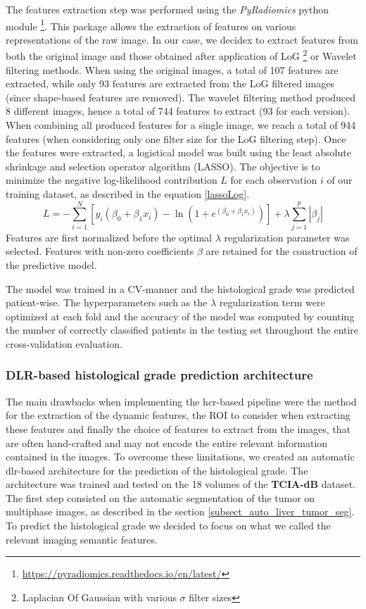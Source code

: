 \documentclass[]{article}
\newcommand{\lmttfont}[1]{{\fontfamily{lmtt}\selectfont #1}}
\begin{document}
The features extraction step was performed using the \textit{PyRadiomics} python module \footnote{\url{https://pyradiomics.readthedocs.io/en/latest/}}. This package allows the extraction of features on various representations of the raw image. In our case, we decidex to extract features from both the original image and those obtained after application of LoG \footnote{Laplacian Of Gaussian with various $\sigma$ filter sizes} or Wavelet filtering methods. When using the original images, a total of 107 features are extracted, while only 93 features are extracted from the LoG filtered images (since shape-based features are removed). The wavelet filtering method produced 8 different images, hence a total of 744 features to extract (93 for each version). When combining all produced features for a single image, we reach a total of 944 features (when considering only one filter size for the LoG filtering step).
Once the features were extracted, a logistical model was built using the least absolute shrinkage and selection operator algorithm (LASSO). The objective is to minimize the negative log-likelihood contribution $L$ for each observation $ i $ of our training dataset, as described in the equation \ref{lassoLog}.
\begin{equation} \label{lassoLog}
L = -\sum_{i=1}^{N} \left[ y_{i} \left( {\beta}_{0} + {\beta}_{1} x_{i} \right) -\ln \left( 1+e^{({\beta}_{0} + {\beta}_{1} x_{i})} \right) \right] + \lambda \sum_{j=1}^{p} \left| {\beta}_{j} \right|
\end{equation}
Features are first normalized before the optimal $ \lambda  $ regularization parameter was selected. Features with non-zero coefficients $ \beta $ are retained for the construction of the predictive model.

The model was trained in a CV-manner and the histological grade was predicted patient-wise. The hyperparameters such as the $ \lambda $ regularization term were optimized at each fold and the accuracy of the model was computed by counting the number of correctly classified patients in the testing set throughout the entire cross-validation evaluation.

\subsubsection{DLR-based histological grade prediction architecture}\label{dlr-based_method}

The main drawbacks when implementing the \ac{hcr}-based pipeline were the method for the extraction of the dynamic features, the ROI to consider when extracting these features and finally the choice of features to extract from the images, that are often hand-crafted and may not encode the entire relevant information contained in the images.
To overcome these limitations, we created an automatic \ac{dlr}-based architecture for the prediction of the histological grade. The architecture was trained and tested on the 18 volumes of the \textbf{\lmttfont{TCIA-dB}} dataset.
The first step consisted on the automatic segmentation of the tumor on multiphase images, as described in the section \ref{subsect_auto_liver_tumor_seg}.
To predict the histological grade we decided to focus on what we called the
relevant imaging semantic features.
\end{document}
